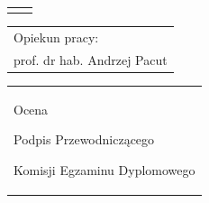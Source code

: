 \begin{titlepage}
{\begin{center}
	\vspace*{7\baselineskip}
	\hfill\mbox{}\par\vspace*{\baselineskip}\noindent
	\begin{tabular}[b]{@{}p{3cm}@{\ }l@{}}
	    {\large\hfill } & {\large }
	\end{tabular}
	\hfill
	\begin{tabular}[b]{@{}l@{}}
	Opiekun pracy: \\[\smallskipamount]
	{\large prof. dr hab. Andrzej Pacut}
	\end{tabular}\par
	\vspace*{4\baselineskip}
    \begin{tabular}{p{\textwidth}}
    \begin{flushleft}
	\begin{minipage}{7cm}
	Ocena \dotfill
	\par\vspace{1.6\baselineskip}
	\dotfill
	\par\noindent
	\centerline{\footnotesize Podpis Przewodniczącego} \par
	\centerline{\footnotesize Komisji Egzaminu Dyplomowego}\par
	\end{minipage}
    \end{flushleft}
    \end{tabular}
    \end{center}}


\end{titlepage}
